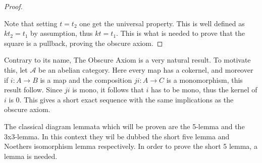 \begin{proof}
\begin{center}
        \end{center}
        Note that setting $t=t_2$ one get the universal property. This is well defined as $kt_2=t_1$ by assumption, thus $kt=t_1$. This is what is needed to prove that the square is a pullback, proving the obscure axiom.
    \end{proof}

    Contrary to its name, The Obscure Axiom is a very natural result. To motivate this, let $\mathcal{A}$ be an abelian category. Here every map has a cokernel, and moreover if $i : A \rightarrow B$ is a map and the composition $ji : A \rightarrow C$ is a monomorphism, this result follow. Since $ji$ is mono, it follows that $i$ has to be mono, thus the kernel of $i$ is $0$. This gives a short exact sequence with the same implications as the obscure axiom.
    \begin{center}
    \end{center}

    The classical diagram lemmata which will be proven are the 5-lemma and the 3x3-lemma. In this context they wil be dubbed the short five lemma and Noethers isomorphism lemma respectively. In order to prove the short 5 lemma, a lemma is needed.

